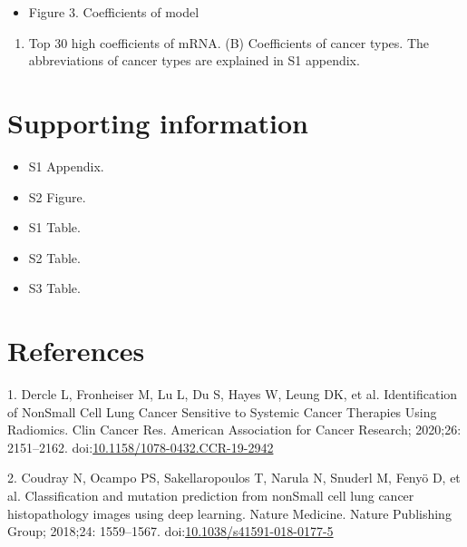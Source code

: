 \documentclass[10pt,letterpaper]{article}
\providecommand{\tightlist}{%
  \setlength{\itemsep}{0pt}\setlength{\parskip}{0pt}}
\begin{document}
\begin{itemize}
\tightlist
\item
  Figure 3. Coefficients of model
\end{itemize}

\begin{enumerate}
\def\labelenumi{(\Alph{enumi})}
\tightlist
\item
  Top 30 high coefficients of mRNA. (B) Coefficients of cancer types.
  The abbreviations of cancer types are explained in S1 appendix.
\end{enumerate}

\hypertarget{supporting-information}{%
\section{Supporting information}\label{supporting-information}}

\begin{itemize}
\tightlist
\item
  S1 Appendix.\\
\item
  S2 Figure.\\
\item
  S1 Table.\\
\item
  S2 Table.\\
\item
  S3 Table.
\end{itemize}

\hypertarget{references}{%
\section*{References}\label{references}}

\hypertarget{refs}{}
\leavevmode\hypertarget{ref-dercleIdentificationNonSmall2020}{}%
1. Dercle L, Fronheiser M, Lu L, Du S, Hayes W, Leung DK, et al.
Identification of NonSmall Cell Lung Cancer Sensitive to Systemic Cancer
Therapies Using Radiomics. Clin Cancer Res. American Association for
Cancer Research; 2020;26: 2151--2162.
doi:\href{https://doi.org/10.1158/1078-0432.CCR-19-2942}{10.1158/1078-0432.CCR-19-2942}

\leavevmode\hypertarget{ref-coudrayClassificationMutationPrediction2018}{}%
2. Coudray N, Ocampo PS, Sakellaropoulos T, Narula N, Snuderl M, Fenyö
D, et al. Classification and mutation prediction from nonSmall cell lung
cancer histopathology images using deep learning. Nature Medicine.
Nature Publishing Group; 2018;24: 1559--1567.
doi:\href{https://doi.org/10.1038/s41591-018-0177-5}{10.1038/s41591-018-0177-5}
\end{document}
